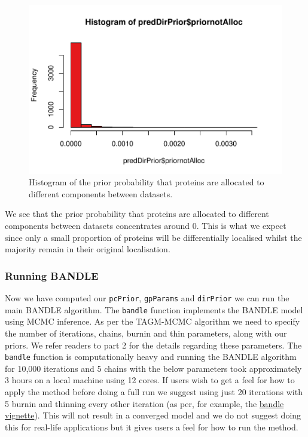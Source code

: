 \documentclass[9pt,a4paper,]{extarticle}
\begin{document}
\begin{figure}[H]

{\centering \includegraphics[width=0.8\linewidth,]{figs/bandle_prior_hist} 

}

\caption{Histogram of the prior probability that proteins are allocated to different components between datasets.}\label{fig:fig-dirprior}
\end{figure}

We see that the prior probability that proteins are allocated to different
components between datasets concentrates around 0. This is what we expect since
only a small proportion of proteins will be differentially localised whilst the
majority remain in their original localisation.

\subsubsection{Running BANDLE}\label{running-bandle}

Now we have computed our \texttt{pcPrior}, \texttt{gpParams} and \texttt{dirPrior} we can run the main
BANDLE algorithm. The \texttt{bandle} function implements the BANDLE model using MCMC
inference. As per the TAGM-MCMC algorithm we need to specify the number of
iterations, chains, burnin and thin parameters, along with our priors. We refer
readers to part 2 for the details regarding these parameters. The \texttt{bandle}
function is computationally heavy and running the BANDLE algorithm for 10,000 iterations
and 5 chains with the below parameters took approximately 3 hours on a local
machine using 12 cores. If users wish to get a feel for how to apply the method
before doing a full run we suggest using just 20 iterations with 5 burnin and
thinning every other iteration (as per, for example, the \href{https://www.bioconductor.org/packages/release/bioc/vignettes/bandle/inst/doc/v01-getting-started.html}{bandle vignette}).
This will not result in a converged model and we do not suggest doing this for
real-life applications but it gives users a feel for how to run the method.
\end{document}
